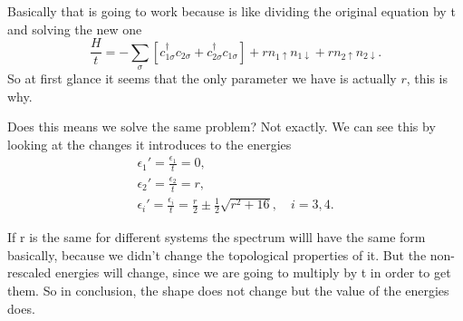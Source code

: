 \begin{questions}
\begin{solution}
Basically that is going to work because is like dividing the original equation by t and solving the new one
\begin{equation}
  \frac{H}{t} = - \sum_\sigma [ c_{1\sigma}^\dagger c_{2\sigma} + c_{2\sigma}^\dagger c_{1\sigma}] + r n_{1\uparrow}n_{1\downarrow} +  r n_{2\uparrow}n_{2\downarrow}.
\end{equation}
So at first glance it seems that the only parameter we have is actually $r$, this is why.

Does this means we solve the same problem? Not exactly. We can see this by looking at the changes it introduces to the energies
\begin{eqnarray}
  \epsilon_1' = \frac{\epsilon_1}{t} = 0,\\
  \epsilon_2' = \frac{\epsilon_2}{t} = r, \\
  \epsilon_i' = \frac{\epsilon_i}{t} = \frac{r}{2} \pm \frac{1}{2}\sqrt{r^2 + 16}, \quad i=3,4.
\end{eqnarray}

If r is the same for different systems the spectrum willl have the same form basically, because we didn't change the topological properties of it. But the non-rescaled energies will change, since we are going to multiply by t in order to get them. So in conclusion, the shape does not change but the value of the energies does.
\end{solution}
\end{questions}

%
%
